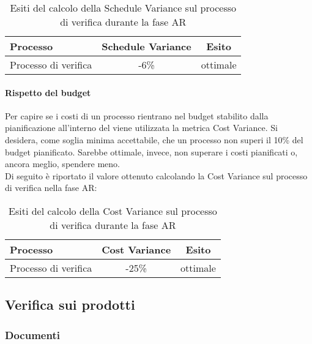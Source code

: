 \documentclass[PianoDiQualifica.tex]{subfiles}
\begin{document}
			\begin{table}[h]
				\centering
				\begin{tabular}{l c c}
					\hline
					\rule[-0.3cm]{0cm}{0.8cm}
					\textbf{Processo} & \textbf{Schedule Variance} & \textbf{Esito} \\
					\hline
					\rule[0cm]{0cm}{0.4cm}
					Processo di verifica & -6\% & ottimale \\
					\hline
				\end{tabular}
				\caption{Esiti del calcolo della Schedule Variance sul processo di verifica durante la fase AR}
			\end{table}		
		
			
			
		\paragraph{Rispetto del budget}
		
		Per capire se i costi di un processo rientrano nel budget stabilito dalla pianificazione all'interno del \PPdocRR{} viene utilizzata la metrica Cost Variance. Si desidera, come soglia minima accettabile, che un processo non superi il 10\% del budget pianificato. Sarebbe ottimale, invece, non superare i costi pianificati o, ancora meglio, spendere meno.\\
		Di seguito è riportato il valore ottenuto calcolando la Cost Variance sul processo di verifica nella fase AR:\\
		
		
		
		\begin{table}[h]
				\centering
				\begin{tabular}{l c c}
					\hline
					\rule[-0.3cm]{0cm}{0.8cm}
					\textbf{Processo} & \textbf{Cost Variance} & \textbf{Esito} \\
					\hline
					\rule[0cm]{0cm}{0.4cm}
					Processo di verifica & -25\% & ottimale \\
					\hline
				\end{tabular}
				\caption{Esiti del calcolo della Cost Variance sul processo di verifica durante la fase AR}
			\end{table}		
		
\newpage		
\subsection{Verifica sui prodotti}
	\subsubsection{Documenti}
\end{document}
